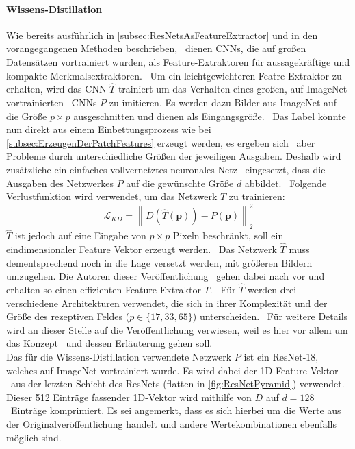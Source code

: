 \paragraph*{Wissens-Distillation}\label{par:wissensdistillation}
Wie bereits ausführlich in \ref{subsec:ResNetsAsFeatureExtractor} und in den vorangegangenen Methoden beschrieben, \
dienen CNNs, die auf großen Datensätzen vortrainiert wurden, als Feature-Extraktoren für aussagekräftige und kompakte Merkmalsextraktoren. \
Um ein leichtgewichteren Featre Extraktor zu erhalten, wird das CNN $\hat{T}$ trainiert um das Verhalten eines großen, auf ImageNet vortrainierten \
CNNs $P$ zu imitieren. Es werden dazu Bilder aus ImageNet auf die Größe $p\times p$ ausgeschnitten und dienen als Eingangsgröße. \
Das Label könnte nun direkt aus einem Einbettungsprozess wie bei \ref{subsec:ErzeugenDerPatchFeatures} erzeugt werden, es ergeben sich \
aber Probleme durch unterschiedliche Größen der jeweiligen Ausgaben. Deshalb wird zusätzliche ein einfaches vollvernetztes neuronales Netz \
eingesetzt, dass die Ausgaben des Netzwerkes $P$ auf die gewünschte Größe $d$ abbildet. \
Folgende Verlustfunktion wird verwendet, um das Netzwerk $T$ zu trainieren: \
$$
\mathcal{L}_{KD} = \left\lVert D(\hat{T}(\mathbf{p}))-P(\mathbf{p}) \right\rVert_{2}^{2}
$$
$\hat{T}$ ist jedoch auf eine Eingabe von $p\times p$ Pixeln beschränkt, soll ein eindimensionaler Feature Vektor erzeugt werden. \
Das Netzwerk $\hat{T}$ muss dementsprechend noch in die Lage versetzt werden, mit größeren Bildern umzugehen. Die Autoren dieser Veröffentlichung \
gehen dabei nach \cite{bailer2018fast} vor und erhalten so einen effizienten Feature Extraktor $T$. \
Für $\hat{T}$ werden drei verschiedene Architekturen verwendet, die sich in ihrer Komplexität und der Größe des rezeptiven Feldes ($p\in\{17,33,65\}$) unterscheiden. \
Für weitere Details wird an dieser Stelle auf die Veröffentlichung \cite{bailer2018fast} verwiesen, weil es hier vor allem um das Konzept \
und dessen Erläuterung gehen soll. \\
Das für die Wissens-Distillation verwendete Netzwerk $P$ ist ein ResNet-18, welches auf ImageNet vortrainiert wurde. Es wird dabei der 1D-Feature-Vektor \
aus der letzten Schicht des ResNets (\glqq flatten\grqq{} in \ref{fig:ResNetPyramid}) verwendet. Dieser 512 Einträge fassender 1D-Vektor wird mithilfe von $D$ auf $d=128$\
Einträge komprimiert. Es sei angemerkt, dass es sich hierbei um die Werte aus der Originalveröffentlichung handelt und andere Wertekombinationen ebenfalls möglich sind. \
